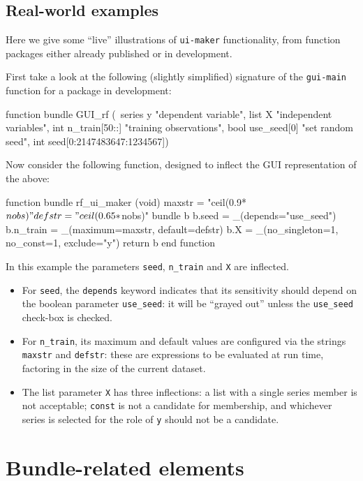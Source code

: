 \documentclass[oneside]{book}
\begin{document}
\subsection{Real-world examples}

Here we give some ``live'' illustrations of \texttt{ui-maker}
functionality, from function packages either already published or in
development.

First take a look at the following (slightly simplified) signature of
the \texttt{gui-main} function for a package in development:
\begin{code}
function bundle GUI_rf (\
   series y "dependent variable",
   list X "independent variables",
   int n_train[50::] "training observations",
   bool use_seed[0] "set random seed",
   int seed[0:2147483647:1234567])
\end{code}
Now consider the following function, designed to inflect the GUI
representation of the above:
\begin{code}
function bundle rf_ui_maker (void)
   maxstr = "ceil(0.9*$nobs)"
   defstr = "ceil(0.65*$nobs)"
   bundle b
   b.seed = _(depends="use_seed")
   b.n_train = _(maximum=maxstr, default=defstr)
   b.X = _(no_singleton=1, no_const=1, exclude="y")
   return b
end function
\end{code}

In this example the parameters \texttt{seed}, \texttt{n\_train} and
\texttt{X} are inflected.
\begin{itemize}
\item For \texttt{seed}, the \texttt{depends} keyword indicates that
  its sensitivity should depend on the boolean parameter
  \texttt{use\_seed}: it will be ``grayed out'' unless the
  \texttt{use\_seed} check-box is checked.
\item For \texttt{n\_train}, its maximum and default values are
  configured via the strings \texttt{maxstr} and \texttt{defstr}:
  these are expressions to be evaluated at run time, factoring in the
  size of the current dataset.
\item The list parameter \texttt{X} has three inflections: a list with
  a single series member is not acceptable; \texttt{const} is not a
  candidate for membership, and whichever series is selected for the
  role of \texttt{y} should not be a candidate.
\end{itemize}



\section{Bundle-related elements}
\label{sec:spec-bundle}
\end{document}
